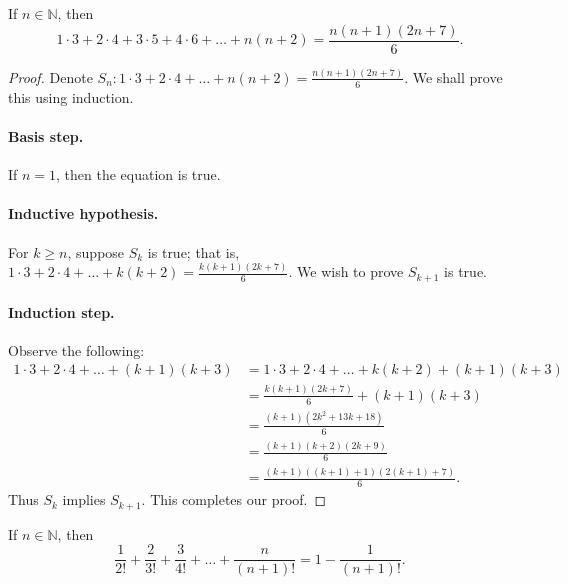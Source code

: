 \documentclass{exam}
\begin{document}
\begin{proposition}{10.7}
    If $n\in\mathbb N$, then $$1\cdot3+2\cdot4+3\cdot5+4\cdot6+\dots+n(n+2)=\frac{n(n+1)(2n+7)}6.$$
\end{proposition}

\begin{proof}
    Denote $S_n:1\cdot3+2\cdot4+\dots+n(n+2)=\frac{n(n+1)(2n+7)}6$. We shall prove this using induction.
    \paragraph{Basis step.} If $n=1$, then the equation is true.
    \paragraph{Inductive hypothesis.} For $k \ge n$, suppose $S_k$ is true; that is, $1\cdot3+2\cdot4+\dots+k(k+2)=\frac{k(k+1)(2k+7)}6$. We wish to prove $S_{k+1}$ is true.
    \paragraph{Induction step.} Observe the following:
    \begin{align*}
        1\cdot3+2\cdot4+\dots+(k+1)(k+3)&=1\cdot3+2\cdot4+\dots+k(k+2)+(k+1)(k+3)\\
        &=\frac{k(k+1)(2k+7)}6+(k+1)(k+3)\\
        &=\frac{(k+1)(2k^2+13k+18)}6\\
        &=\frac{(k+1)(k+2)(2k+9)}6\\
        &=\frac{(k+1)((k+1)+1)(2(k+1)+7)}6.
    \end{align*}
    Thus $S_k$ implies $S_{k+1}$. This completes our proof.
\end{proof}

\begin{proposition}{10.8}
    If $n\in\mathbb N$, then $$\frac1{2!}+\frac2{3!}+\frac3{4!}+\dots+\frac{n}{(n+1)!}=1-\frac{1}{(n+1)!}.$$
\end{proposition}
\end{document}
